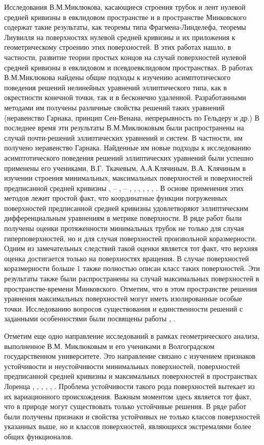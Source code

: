 \documentclass[a4paper,11pt,twoside]{article}
\begin{document}
	Исследования В.М.Миклюкова, касающиеся строения трубок и лент нулевой средней кривизны в евклидовом пространстве и в  пространстве Минковского содержат такие результаты, как теоремы типа Фрагмена-Линделефа, теоремы Лиувилля на поверхностях нулевой средней кривизны и их приложения к геометрическому строению этих поверхностей. В этих работах нашло, в частности,  развитие теории простых концов на случай поверхностей нулевой средней кривизны в евклидовом и псевдоевклидовом пространствах. В работах В.М.Миклюкова найдены общие подходы к изучению асимптотического поведения решений нелинейных уравнений эллиптического типа, как в окрестности конечной точки, так и в бесконечно удаленной. Разработанными методами им получены различные свойства решений таких уравнений (неравенство Гарнака, принцип Сен-Венана, непрерывность по Гельдеру и др.) В последнее время эти результаты В.М.Миклюковым были распространены на случай почти-решений эллиптических уравнений и систем. В частности, им получено неравенство Гарнака. Найденные им новые подходы к исследованию асимптотического поведения решений эллиптических уравнений были успешно применены его учениками, В.Г. Ткачевым, А.А.Клячиным, В.А. Клячиным в изучении строения минимальных, максимальных поверхностей и поверхностей предписанной средней кривизны  \cite{8}, \cite{10} -- \cite{12}, \cite{14} -- \cite{16}, \cite{19}, \cite{20}, \cite{23}, \cite{58}, \cite{59}, \cite{63}. В основе применения этих методов лежит простой факт, что координатные функции погруженных поверхностей предписанной средней кривизны удовлетворяют эллиптическим дифференциальным уравнениям в метрике поверхности. В ряде работ были получены оценки протяженности минимальных трубок не только для случая гиперповерхностей, но и для случая поверхностей произвольной коразмерности. Одним из замечательных следствий такой оценки является тот факт, что  верхняя оценка достигается только на поверхностях вращения. В случае поверхностей коразмерности больше 1 также полностью описан класс таких поверхностей. Эти результаты также были распространены на случай максимальных поверхностей в пространстве-времени Минковского. Отметим, что в этом пространстве решения уравнения максимальных поверхностей могут иметь изолированные особые точки. Исследованию вопросов существования и единственности решений с заданными особенностями были посвящены работы \cite{dop3}, \cite{dop4}.
	
	Отметим еще одно направление исследований в рамках геометрического анализа, выполненное В.М. Миклюковым и его учениками в Волгоградском государственном университете. Это направление связано с изучением признаков устойчивости и неустойчивости минимальных поверхностей, поверхностей предписанной средней кривизны и максимальных поверхностей в пространствах Лоренца \cite{7}, \cite{13}, \cite{18}, \cite{21}, \cite{22}, \cite{31}. Проблема устойчивости такого рода поверхностей вытекает из их вариационного происхождения. Важным моментом здесь является тот факт, что в природе могут существовать только устойчивые решения.  В ряде работ были получены признаки и свойства устойчивых не только классов поверхностей указанных выше, но и классов поверхностей, являющихся экстремалями более общих функционалов.
	
\end{document}
